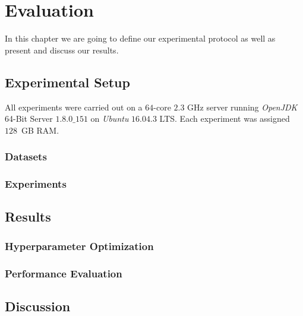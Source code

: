 \chapter{Evaluation}
\label{ch:eval}
In this chapter we are going to define our experimental protocol as well as present and discuss our results.
\section{Experimental Setup}
\label{sec:experimentalsetup}
All experiments were carried out on a $64$-core $2.3$ GHz server running \emph{OpenJDK} 64-Bit Server $1.8.0\_151$ on \emph{Ubuntu} $16.04.3$ LTS. 
Each experiment was assigned $128$~GB RAM.


\subsection{Datasets}
\label{ssec:datasets}

\subsection{Experiments}
\label{ssec:experiments}

\section{Results}
\label{sec:results}

\subsection{Hyperparameter Optimization}
\label{ssec:hpo}


\subsection{Performance Evaluation}
\label{ssec:performance}

\section{Discussion}
\label{sec:discussion}

%
